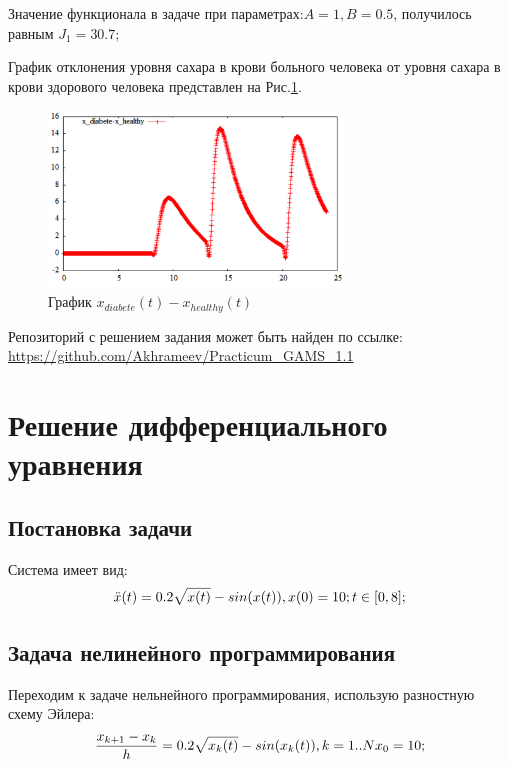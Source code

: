 \documentclass[14pt]{article}
\begin{document}
Значение функционала в  задаче при параметрах:$A=1, B=0.5$, получилось равным $J_1 = 30.7$;

График отклонения уровня сахара в крови больного человека от уровня сахара в крови здорового человека представлен на Рис.\ref{task1_dx}.

\begin{figure}
\centering
\includegraphics[width=0.7\textwidth]{x_diabete-x_healthy}
\caption{График $x_{diabete}(t)-x_{healthy}(t)$}
\label{task1_dx}
\end{figure}

Репозиторий с решением задания может быть найден по ссылке:
\url{https://github.com/Akhrameev/Practicum_GAMS_1.1}

\newpage


\section{Решение дифференциального уравнения}

\subsection{Постановка задачи}
Система имеет вид:
\begin{equation}\label{syst2_oo}
\ddot{x}(t)=0.2\sqrt{x(t)}-sin(x(t)),\\
x(0)=10; t\in[0,8];
\end{equation}

\subsection{Задача нелинейного программирования}
Переходим к задаче нельнейного программирования, использую разностную схему Эйлера:
\begin{equation}
\frac{x_{k+1}-x_k}{h}=0.2\sqrt{x_k(t)}-sin(x_k(t)), k=1..N\\
x_0=10;
\end{equation}
\end{document}
